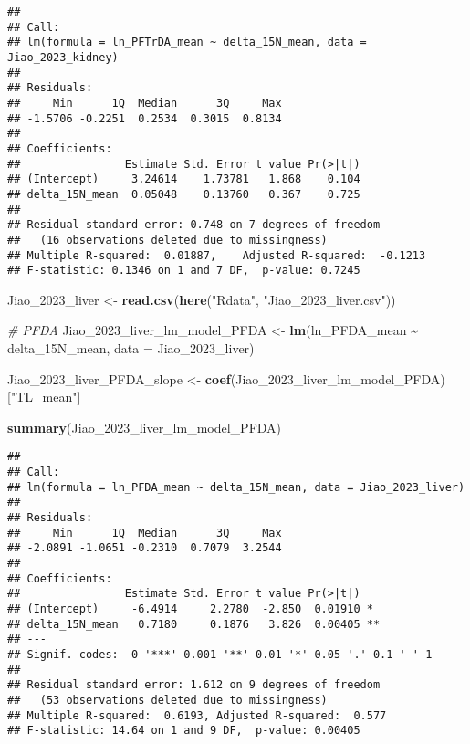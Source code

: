 \documentclass[
]{article}
\newenvironment{Shaded}{\begin{snugshade}}{\end{snugshade}}
\newcommand{\AttributeTok}[1]{\textcolor[rgb]{0.13,0.29,0.53}{#1}}
\newcommand{\CommentTok}[1]{\textcolor[rgb]{0.56,0.35,0.01}{\textit{#1}}}
\newcommand{\FunctionTok}[1]{\textcolor[rgb]{0.13,0.29,0.53}{\textbf{#1}}}
\newcommand{\NormalTok}[1]{#1}
\newcommand{\OtherTok}[1]{\textcolor[rgb]{0.56,0.35,0.01}{#1}}
\newcommand{\SpecialCharTok}[1]{\textcolor[rgb]{0.81,0.36,0.00}{\textbf{#1}}}
\newcommand{\StringTok}[1]{\textcolor[rgb]{0.31,0.60,0.02}{#1}}
\begin{document}
\begin{verbatim}
## 
## Call:
## lm(formula = ln_PFTrDA_mean ~ delta_15N_mean, data = Jiao_2023_kidney)
## 
## Residuals:
##     Min      1Q  Median      3Q     Max 
## -1.5706 -0.2251  0.2534  0.3015  0.8134 
## 
## Coefficients:
##                Estimate Std. Error t value Pr(>|t|)
## (Intercept)     3.24614    1.73781   1.868    0.104
## delta_15N_mean  0.05048    0.13760   0.367    0.725
## 
## Residual standard error: 0.748 on 7 degrees of freedom
##   (16 observations deleted due to missingness)
## Multiple R-squared:  0.01887,    Adjusted R-squared:  -0.1213 
## F-statistic: 0.1346 on 1 and 7 DF,  p-value: 0.7245
\end{verbatim}

\begin{Shaded}
\begin{Highlighting}[]
\NormalTok{Jiao\_2023\_liver }\OtherTok{\textless{}{-}} \FunctionTok{read.csv}\NormalTok{(}\FunctionTok{here}\NormalTok{(}\StringTok{"Rdata"}\NormalTok{, }\StringTok{"Jiao\_2023\_liver.csv"}\NormalTok{))}

\CommentTok{\# PFDA}
\NormalTok{Jiao\_2023\_liver\_lm\_model\_PFDA }\OtherTok{\textless{}{-}} \FunctionTok{lm}\NormalTok{(ln\_PFDA\_mean }\SpecialCharTok{\textasciitilde{}}\NormalTok{ delta\_15N\_mean,}
                                    \AttributeTok{data =}\NormalTok{ Jiao\_2023\_liver)}

\NormalTok{Jiao\_2023\_liver\_PFDA\_slope }\OtherTok{\textless{}{-}} \FunctionTok{coef}\NormalTok{(Jiao\_2023\_liver\_lm\_model\_PFDA)[}\StringTok{"TL\_mean"}\NormalTok{]}

\FunctionTok{summary}\NormalTok{(Jiao\_2023\_liver\_lm\_model\_PFDA)}
\end{Highlighting}
\end{Shaded}

\begin{verbatim}
## 
## Call:
## lm(formula = ln_PFDA_mean ~ delta_15N_mean, data = Jiao_2023_liver)
## 
## Residuals:
##     Min      1Q  Median      3Q     Max 
## -2.0891 -1.0651 -0.2310  0.7079  3.2544 
## 
## Coefficients:
##                Estimate Std. Error t value Pr(>|t|)   
## (Intercept)     -6.4914     2.2780  -2.850  0.01910 * 
## delta_15N_mean   0.7180     0.1876   3.826  0.00405 **
## ---
## Signif. codes:  0 '***' 0.001 '**' 0.01 '*' 0.05 '.' 0.1 ' ' 1
## 
## Residual standard error: 1.612 on 9 degrees of freedom
##   (53 observations deleted due to missingness)
## Multiple R-squared:  0.6193, Adjusted R-squared:  0.577 
## F-statistic: 14.64 on 1 and 9 DF,  p-value: 0.00405
\end{verbatim}
\end{document}
